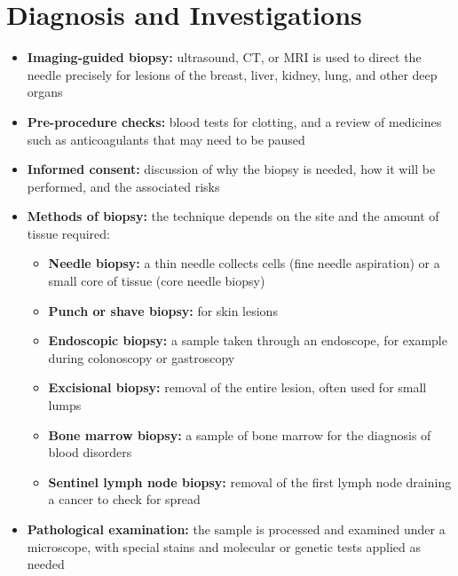 \section*{Diagnosis and Investigations}
\begin{itemize}
    \item \textbf{Imaging-guided biopsy:} ultrasound, CT, or MRI is used to direct the needle precisely for lesions of the breast, liver, kidney, lung, and other deep organs
    \item \textbf{Pre-procedure checks:} blood tests for clotting, and a review of medicines such as anticoagulants that may need to be paused
    \item \textbf{Informed consent:} discussion of why the biopsy is needed, how it will be performed, and the associated risks
    \item \textbf{Methods of biopsy:} the technique depends on the site and the amount of tissue required:
    \begin{itemize}
        \item \textbf{Needle biopsy:} a thin needle collects cells (fine needle aspiration) or a small core of tissue (core needle biopsy)
        \item \textbf{Punch or shave biopsy:} for skin lesions
        \item \textbf{Endoscopic biopsy:} a sample taken through an endoscope, for example during colonoscopy or gastroscopy
        \item \textbf{Excisional biopsy:} removal of the entire lesion, often used for small lumps
        \item \textbf{Bone marrow biopsy:} a sample of bone marrow for the diagnosis of blood disorders
        \item \textbf{Sentinel lymph node biopsy:} removal of the first lymph node draining a cancer to check for spread
    \end{itemize}
    \item \textbf{Pathological examination:} the sample is processed and examined under a microscope, with special stains and molecular or genetic tests applied as needed
\end{itemize}

